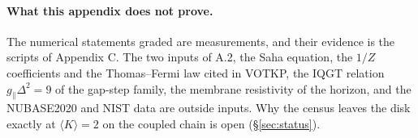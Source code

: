\paragraph{What this appendix does not prove.} The numerical statements graded  are measurements, and their evidence is the scripts of Appendix C. The two inputs of A.2, the Saha equation, the $1/Z$ coefficients and the Thomas–Fermi law cited in VOTKP, the IQGT relation $g_\parallel\Delta^2=9$ of the gap-step family, the membrane resistivity of the horizon, and the NUBASE2020 and NIST data are outside inputs. Why the census leaves the disk exactly at $\langle K\rangle=2$ on the coupled chain is open (§\ref{sec:status}).
